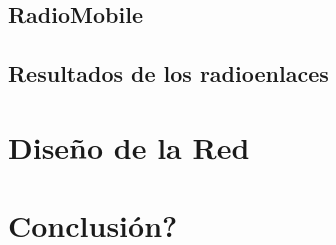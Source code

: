 \documentclass{article}
\begin{document}
\subsection{RadioMobile}

\subsection{Resultados de los radioenlaces}

\section{Diseño de la Red}

\section{Conclusión?}
\end{document}
